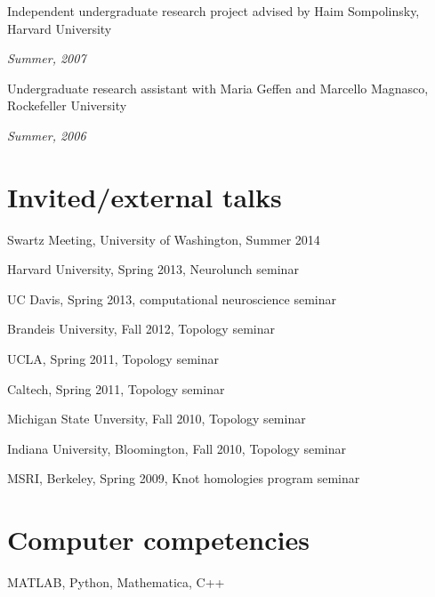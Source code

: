 \documentclass[letterpaper]{article}
\renewenvironment{itemize}{
  \begin{list}{}{
    \setlength{\leftmargin}{1.5em}
  }
}{
  \end{list}
}
\begin{document}
\begin{itemize}

\item Independent undergraduate research project advised by Haim Sompolinsky, Harvard University 

\textit{Summer, 2007}

\item Undergraduate research assistant with  Maria Geffen and Marcello Magnasco, Rockefeller University

\textit{Summer, 2006}

\end{itemize}

\section*{Invited/external talks}

\begin{itemize}

\item Swartz Meeting, University of Washington, Summer 2014
\item Harvard University, Spring 2013, Neurolunch seminar
\item UC Davis, Spring 2013, computational neuroscience seminar
\item Brandeis University, Fall 2012, Topology seminar
\item UCLA, Spring 2011, Topology seminar
\item Caltech, Spring 2011, Topology seminar
\item Michigan State Unversity, Fall 2010, Topology seminar
\item Indiana University, Bloomington, Fall 2010, Topology seminar
\item MSRI, Berkeley, Spring 2009, Knot homologies program seminar

\end{itemize}

\section*{Computer competencies}

\begin{itemize}
\item MATLAB, Python, Mathematica, C++

\end{itemize}


\bigskip
\end{document}
